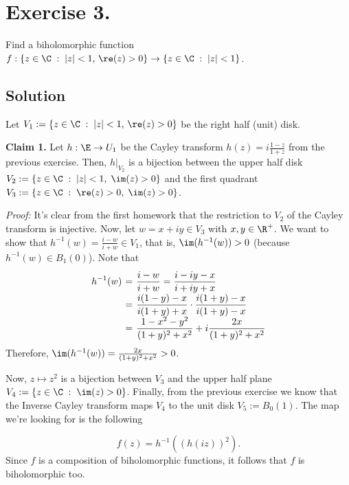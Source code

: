 
\section{Exercise 3.}

Find a biholomorphic function $f : \{z \in \C \;:\; |z| < 1,\,\re(z) > 0\} \to \{z\in \C \;:\; |z| < 1\}$.

\subsection*{Solution}

Let $V_1 := \{z \in \C \;:\; |z| < 1,\,\re(z) > 0\}$ be the right half (unit) disk.

\textbf{Claim 1.} Let $h: \E \to U_1$ be the Cayley transform $h(z) = i \frac{1-z}{1+z}$ from the previous exercise. Then, $h|_{V_2}$ is a bijection between the upper half disk $V_2 := \{z \in \C \;:\; |z| < 1,\;\im(z) > 0\}$ and the first quadrant $ V_3 := \{z \in \C \;:\; \re(z)>0,\; \im(z)>0\}$.

\textit{Proof:} It's clear from the first homework that the restriction to $V_2$ of the Cayley transform is injective. Now, let $w = x+iy \in V_3$ with $x,y \in \R^+$. We want to show that $h^{-1}(w) = \frac{i-w}{i+w} \in V_1$, that is, $\im(h^{-1}(w)) > 0$ (because $h^{-1}(w) \in B_1(0)$). Note that
\[ \everymath{\displaystyle}
\arraycolsep=1.8pt\def\arraystretch{1.8}
\begin{array}{rcl}
    h^{-1}(w) & = & \frac{i-w}{i+w} = \frac{i-iy-x}{i+iy+x}\\
    & = & \frac{i(1-y)-x}{i(1+y)+x} \cdot \frac{i(1+y)-x}{i(1+y)-x}\\
    & = & \frac{1-x^2-y^2}{(1+y)^2+x^2} + i \frac{2x}{(1+y)^2+x^2}
\end{array} \]
Therefore, $\im(h^{-1}(w)) = \frac{2x}{(1+y)^2+x^2} > 0$.

Now, $z\mapsto z^2$ is a bijection between $V_3$ and the upper half plane $V_4 := \{z\in\C \;:\; \im(z) > 0\}$. Finally, from the previous exercise we know that the Inverse Cayley transform maps $V_4$ to the unit disk $V_5 := B_0(1)$. The map we're looking for is the following

\begin{center}
\end{center}
\[ f(z) = h^{-1}\left( (h(iz))^2  \right). \]
Since $f$ is a composition of biholomorphic functions, it follows that $f$ is biholomorphic too.